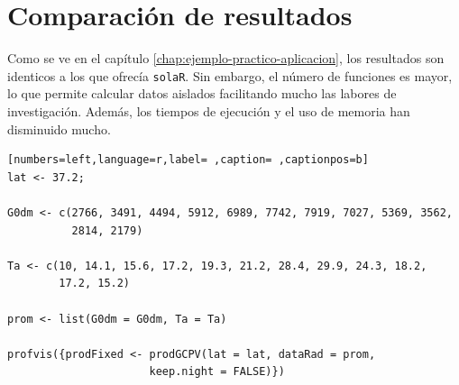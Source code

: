 \section{Comparación de resultados}
\label{sec:orgb26b640}
Como se ve en el capítulo \ref{chap:ejemplo-practico-aplicacion}, los resultados son identicos a los que ofrecía \texttt{solaR}. Sin embargo, el número de funciones es mayor, lo que permite calcular datos aislados facilitando mucho las labores de investigación. Además, los tiempos de ejecución y el uso de memoria han disminuido mucho.
\begin{lstlisting}[numbers=left,language=r,label= ,caption= ,captionpos=b]
lat <- 37.2;

G0dm <- c(2766, 3491, 4494, 5912, 6989, 7742, 7919, 7027, 5369, 3562,
          2814, 2179)

Ta <- c(10, 14.1, 15.6, 17.2, 19.3, 21.2, 28.4, 29.9, 24.3, 18.2,
        17.2, 15.2)

prom <- list(G0dm = G0dm, Ta = Ta)

profvis({prodFixed <- prodGCPV(lat = lat, dataRad = prom,
                      keep.night = FALSE)})
\end{lstlisting}

